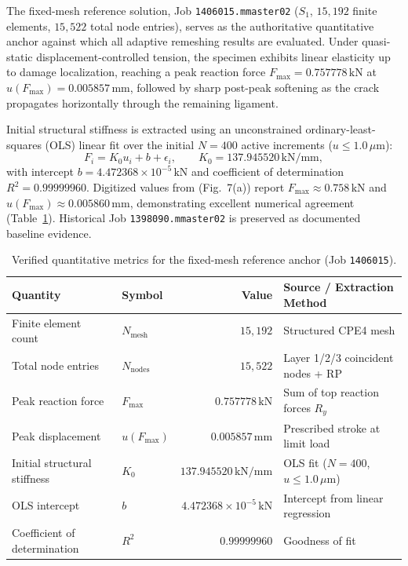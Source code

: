 The fixed-mesh reference solution, Job \texttt{1406015.mmaster02} ($S_1$, $15{,}192$ finite elements, $15{,}522$ total node entries), serves as the authoritative quantitative anchor against which all adaptive remeshing results are evaluated. Under quasi-static displacement-controlled tension, the specimen exhibits linear elasticity up to damage localization, reaching a peak reaction force $F_{\max} = 0.757778\,\mathrm{kN}$ at $u(F_{\max}) = 0.005857\,\mathrm{mm}$, followed by sharp post-peak softening as the crack propagates horizontally through the remaining ligament.

Initial structural stiffness is extracted using an unconstrained ordinary-least-squares (OLS) linear fit over the initial $N = 400$ active increments ($u \le 1.0\,\mu\mathrm{m}$):
\begin{equation}
  F_i = K_0 u_i + b + \epsilon_i, \qquad \boxed{K_0 = 137.945520\,\mathrm{kN/mm}},
  \label{eq:k0_ols_anchor}
\end{equation}
with intercept $b = 4.472368 \times 10^{-5}\,\mathrm{kN}$ and coefficient of determination $R^2 = 0.99999960$. Digitized values from \citet{pandey2025} (Fig.~7(a)) report $F_{\max} \approx 0.758\,\mathrm{kN}$ and $u(F_{\max}) \approx 0.005860\,\mathrm{mm}$, demonstrating excellent numerical agreement (Table~\ref{tab:fixed_reference}). Historical Job \texttt{1398090.mmaster02} is preserved as documented baseline evidence.

\begin{table}[htbp]
\centering
\caption{Verified quantitative metrics for the fixed-mesh reference anchor (Job \texttt{1406015}).}
\label{tab:fixed_reference}
\begin{tabular}{llrl}
\toprule
Quantity & Symbol & Value & Source / Extraction Method \\
\midrule
Finite element count & $N_{\mathrm{mesh}}$ & $15{,}192$ & Structured CPE4 mesh \\
Total node entries & $N_{\mathrm{nodes}}$ & $15{,}522$ & Layer 1/2/3 coincident nodes + RP \\
Peak reaction force & $F_{\max}$ & $0.757778\,\mathrm{kN}$ & Sum of top reaction forces $R_{y}$ \\
Peak displacement & $u(F_{\max})$ & $0.005857\,\mathrm{mm}$ & Prescribed stroke at limit load \\
Initial structural stiffness & $K_0$ & $137.945520\,\mathrm{kN/mm}$ & OLS fit ($N=400$, $u \le 1.0\,\mu\mathrm{m}$) \\
OLS intercept & $b$ & $4.472368 \times 10^{-5}\,\mathrm{kN}$ & Intercept from linear regression \\
Coefficient of determination & $R^2$ & $0.99999960$ & Goodness of fit \\
\bottomrule
\end{tabular}
\end{table}

